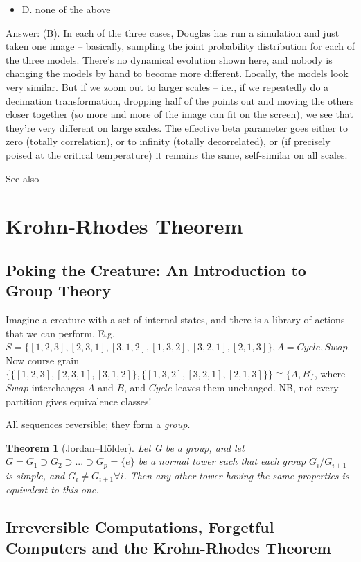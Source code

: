 \documentclass[]{article}
\newtheorem{thm}{Theorem}
\begin{document}
\begin{itemize}
\begin{itemize}
		\item D.  none of the above
	\end{itemize}

	Answer: (B). In each of the three cases, Douglas has run a simulation and just taken one image -- basically, sampling the joint probability distribution for each of the three models. There's no dynamical evolution shown here, and nobody is changing the models by hand to become more different. Locally, the models look very similar. But if we zoom out to larger scales -- i.e., if we repeatedly do a decimation transformation, dropping half of the points out and moving the others closer together (so more and more of the image can fit on the screen), we see that they're very different on large scales. The effective beta parameter goes either to zero (totally correlation), or to infinity (totally decorrelated), or (if precisely poised at the critical temperature) it remains the same, self-similar on all scales.
\end{itemize}

See also \cite{dedeo2012dynamics}

\section{Krohn-Rhodes Theorem}

\subsection{Poking the Creature: An Introduction to Group Theory}

Imagine a creature with a set of internal states, and there is a library of actions that we can perform. E.g. $S=\{[1,2,3],[2,3,1],[3,1,2],[1,3,2],[3,2,1],[2,1,3]\},A={Cycle,Swap}$.
 Now course grain $\{\{[1,2,3],[2,3,1],[3,1,2]\},\{[1,3,2],[3,2,1],[2,1,3]\} \} \cong\{A,B\}$, where $Swap$ interchanges $A$ and $B$, and $Cycle$ leaves them unchanged. NB, not every partition gives equivalence classes!

All sequences reversible; they form a \textit{group}. 

\begin{thm}[Jordan–H\"older]
	Let G be a group, and let $G=G_1 \supset G_2\supset...\supset G_p=\{e\}$ be a normal tower such that each group $G_i/G_{i+1}$ is simple, and $G_i\ne G_{i+1}\forall i$. Then any other tower having the same properties is equivalent to this one.\cite{lang02}
\end{thm}
\subsection{Irreversible Computations, Forgetful Computers and the Krohn-Rhodes Theorem }
\end{document}
